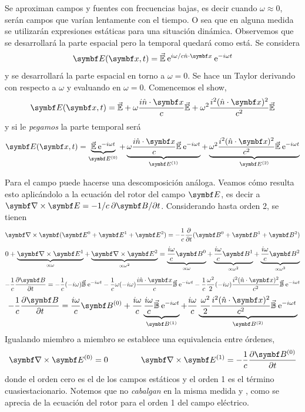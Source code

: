 \documentclass[10pt,oneside]{CBFT_book}
\begin{document}
Se aproximan campos y fuentes con frecuencias bajas, es decir cuando $\omega \approx 0$, serán
campos que varían lentamente con el tiempo.
O sea que en alguna medida se utilizarán expresiones estáticas para una situación dinámica.
Observemos que se desarrollará la parte espacial pero la temporal quedará como está.
Se considera
\[
	\vb{E}(\vb{x},t) = \vec{\mathbb{E}} \euler^{i\omega/c \hat{n}\cdot\vb{x}} \euler^{-i\omega t}
\]
y se desarrollará la parte espacial en torno a $\omega=0$. Se hace un Taylor derivando con respecto
a $\omega$ y evaluando en $\omega=0$.
Comencemos el show,
\[
	\vb{E}(\vb{x},t) = \vec{\mathbb{E}} + \omega\frac{i\hat{n}\cdot\vb{x}}{c} \vec{\mathbb{E}} +
			\omega^2 \frac{i^2(\hat{n}\cdot\vb{x})^2}{c^2} \vec{\mathbb{E}}
\]
y si le {\it pegamos} la parte temporal será
\[
	\vb{E}(\vb{x},t) = \underbrace{ \vec{\mathbb{E}} \euler^{-i\omega t} }_{\vb{E}^{(0)}} + 
	\underbrace{\omega\frac{i\hat{n}\cdot\vb{x}}{c} \vec{\mathbb{E}}\euler^{-i\omega t}}_{\vb{E}^{(1)}} +
	\underbrace{\omega^2\frac{i^2(\hat{n}\cdot\vb{x})^2}{c^2}\vec{\mathbb{E}}\euler^{-i\omega t}}_{\vb{E}^{(2)}}
\]

Para el campo  puede hacerse una descomposición análoga. 
Veamos cómo resulta esto aplicándolo a la ecuación del rotor del campo $\vb{E}$, es decir a
$\rotorm{E} = -1/c \: \partial{\vb{B}}/\partial t$.
Considerando hasta orden 2, se tienen
\[
	\rotorm{}(\vb{E}^0 + \vb{E}^1 + \vb{E}^2) = -\frac{1}{c} \dpar{}{t}(\vb{B}^0 + \vb{B}^1 + \vb{B}^2)
\]
\[
	0 + \underbrace{\rotorm{E}^1}_{\propto \omega } + \underbrace{\rotorm{E}^2}_{\propto \omega^2 } = 
	\underbrace{\frac{i\omega}{c}\vb{B}^0}_{\propto \omega } + \underbrace{\frac{i\omega}{c}
	\vb{B}^1}_{\propto \omega^2 } + \underbrace{\frac{i\omega}{c}\vb{B}^2}_{\propto \omega^3 }
\]
\[
	-\frac{1}{c}\dpar{\vb{B}}{t} = -\frac{1}{c}(-i\omega)\vec{\mathbb{B}}\euler^{-i\omega t}
	-\frac{1}{c}\omega(-i\omega)\frac{i\hat{n}\cdot\vb{x}}{c}\vec{\mathbb{B}}\euler^{-i\omega t}
	-\frac{1}{c}\frac{\omega^2}{2}(-i\omega)\frac{i^2(\hat{n}\cdot\vb{x})^2}{c^2}\vec{\mathbb{B}}\euler^{-i\omega t}
\]
\[
	-\frac{1}{c}\dpar{\vb{B}}{t} = \frac{i\omega}{c}\vb{B}^{(0)} 
	+ \frac{i\omega}{c} \underbrace{\frac{i\omega}{c}\vec{\mathbb{B}}\euler^{-i\omega t}}_{\vb{B}^{(1)}}
	+ \frac{i\omega}{c} \underbrace{ \left.\frac{\omega^2}{2}\frac{i^2(\hat{n}\cdot\vb{x})^2}	
	{c^2}\vec{\mathbb{B}} \euler^{-i\omega t}\right.}_{\vb{B}^{(2)}}
\]
Igualando miembro a miembro se establece una equivalencia entre órdenes,
\[
	\rotorm{E}^{(0)} = 0 \qquad \qquad \rotorm{E}^{(1)} = -\frac{1}{c}\dpar{\vb{B}^{(0)}}{t}
\]
donde el orden cero es el de los campos estáticos y el orden 1 es el término
cuasiestacionario. Notemos que no {\it cabalgan} en la misma medida  y ,
como se aprecia de la ecuación del rotor para el orden 1 del campo eléctrico.
\end{document}
